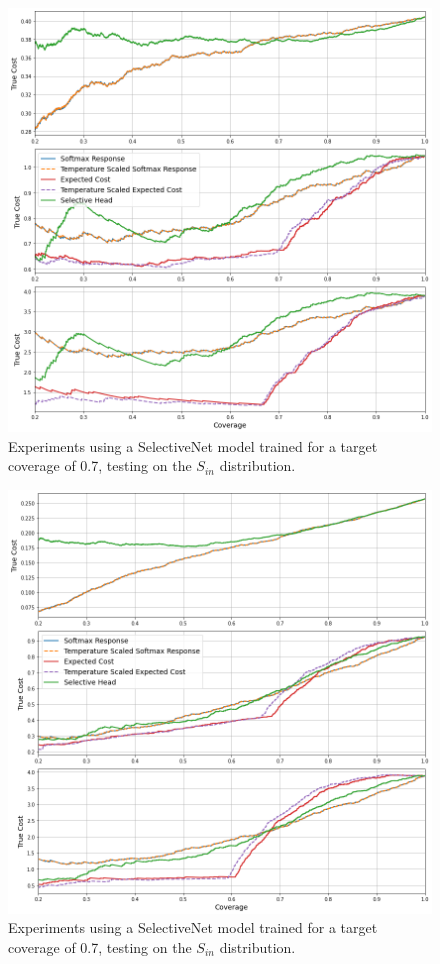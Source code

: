 \begin{figure}[H]
	\includegraphics[width=\textwidth]{images/binary/sn0.7_out_distribution.png}
	\caption*{Experiments using a SelectiveNet model trained for a target coverage of 0.7, testing on the $S_{in}$ distribution.}
\end{figure}

\begin{figure}[H]
	\includegraphics[width=\textwidth]{images/binary/sn0.7_combine_distribution.png}
	\caption*{Experiments using a SelectiveNet model trained for a target coverage of 0.7, testing on the $S_{in}$ distribution.}
\end{figure}

